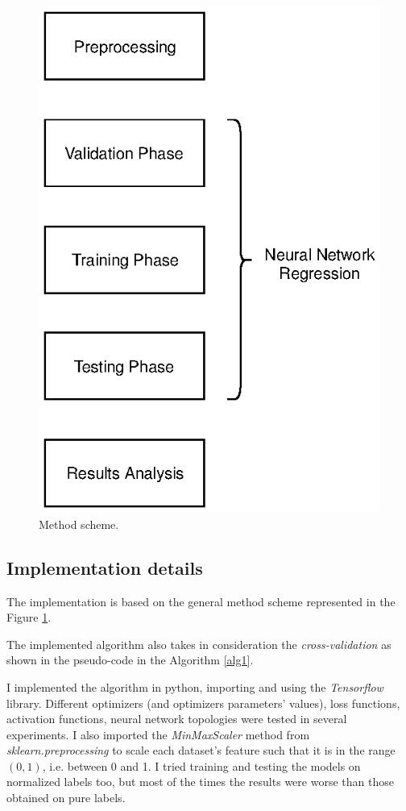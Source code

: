 \documentclass[10pt,journal,A4paper,compsoc,epsfig]{IEEEtran}
\begin{document}
\begin{figure}
\centering
\includegraphics[scale=0.6, trim=0 15cm 3cm 1cm, center]{./Fig/Method_scheme.eps}
\caption{Method scheme.}
\label{Fig:scheme}
\end{figure}


\subsection{Implementation details}
The implementation is based on the general method scheme represented in the Figure \ref{Fig:scheme}.

The implemented algorithm also takes in consideration the \textit{cross-validation} as shown in the pseudo-code in the Algorithm 
\ref{alg1}.

I implemented the algorithm in python, importing and using the \textit{Tensorflow} library.
Different optimizers (and optimizers parameters' values), loss functions, activation functions, neural network topologies were tested in several experiments.
I also imported the \textit{MinMaxScaler} method from \textit{sklearn.preprocessing} to scale each dataset's feature such that it is in the range $(0,1)$, i.e. between 0 and 1. I tried training and testing the models on normalized labels too, but most of the times the results were worse than those obtained on pure labels.
\end{document}
